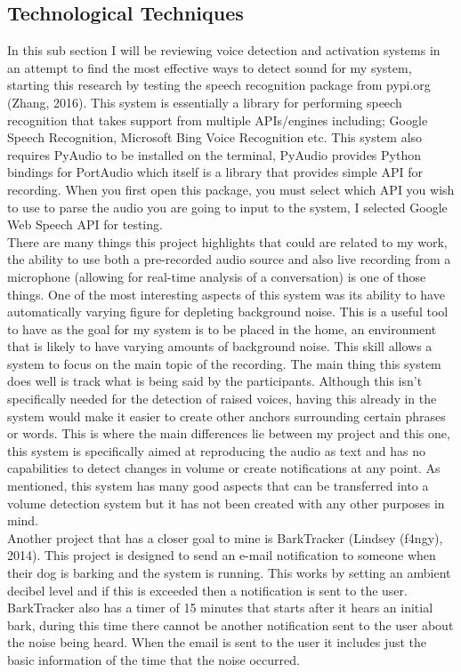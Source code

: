 \documentclass[a4paper,11pt]{report}
\begin{document}
\subsection{Technological Techniques}
In this sub section I will be reviewing voice detection and activation systems in an attempt to find the most effective ways to detect sound for my system, starting this research by testing the speech recognition package from pypi.org (Zhang, 2016). This system is essentially a library for performing speech recognition that takes support from multiple APIs/engines including; Google Speech Recognition, Microsoft Bing Voice Recognition etc. This system also requires PyAudio to be installed on the terminal, PyAudio provides Python bindings for PortAudio which itself is a library that provides simple API for recording. When you first open this package, you must select which API you wish to use to parse the audio you are going to input to the system, I selected Google Web Speech API for testing.\\

There are many things this project highlights that could are related to my work, the ability to use both a pre-recorded audio source and also live recording from a microphone (allowing for real-time analysis of a conversation) is one of those things. One of the most interesting aspects of this system was its ability to have automatically varying figure for depleting background noise. This is a useful tool to have as the goal for my system is to be placed in the home, an environment that is likely to have varying amounts of background noise. This skill allows a system to focus on the main topic of the recording. The main thing this system does well is track what is being said by the participants. Although this isn’t specifically needed for the detection of raised voices, having this already in the system would make it easier to create other anchors surrounding certain phrases or words. This is where the main differences lie between my project and this one, this system is specifically aimed at reproducing the audio as text and has no capabilities to detect changes in volume or create notifications at any point. As mentioned, this system has many good aspects that can be transferred into a volume detection system but it has not been created with any other purposes in mind.\\

Another project that has a closer goal to mine is BarkTracker (Lindsey (f4ngy), 2014). This project is designed to send an e-mail notification to someone when their dog is barking and the system is running. This works by setting an ambient decibel level and if this is exceeded then a notification is sent to the user. BarkTracker also has a timer of 15 minutes that starts after it hears an initial bark, during this time there cannot be another notification sent to the user about the noise being heard. When the email is sent to the user it includes just the basic information of the time that the noise occurred.\\
\end{document}
